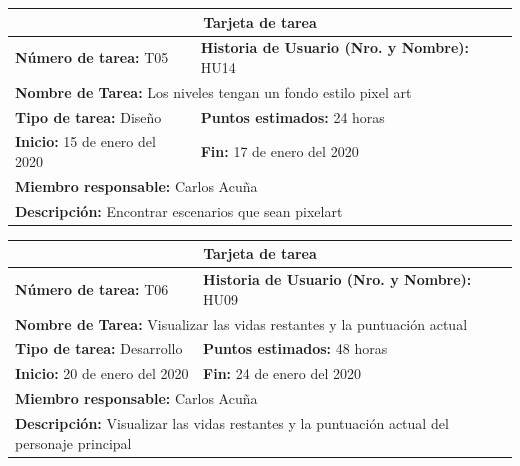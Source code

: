 \documentclass[a4paper, openright, 12pt]{report}
\begin{document}
\begin{longtable}{| p{6cm} | p{6cm} |}
\hline
\multicolumn{2}{|c|}{\textbf{Tarjeta de tarea}} \\
\hline
\textbf{Número de tarea:} T05 & \textbf{Historia de Usuario (Nro. y Nombre):} HU14\\
\hline
\multicolumn{2}{|p{12cm}|}{\textbf{Nombre de Tarea:} Los niveles tengan un fondo estilo pixel art} \\ \hline
\textbf{Tipo de tarea:} Diseño & \textbf{Puntos estimados:} 24 horas  \\ \hline
\textbf{Inicio:} 15 de enero del 2020 & \textbf{Fin:} 17 de enero del 2020 \\ \hline
\multicolumn{2}{|p{12cm}|}{\textbf{Miembro responsable:} Carlos Acuña} \\ \hline
\multicolumn{2}{|p{12cm}|}{\textbf{Descripción:} Encontrar escenarios que sean pixelart} \\ \hline
\end{longtable}

\begin{longtable}{| p{6cm} | p{6cm} |}
\hline
\multicolumn{2}{|c|}{\textbf{Tarjeta de tarea}} \\
\hline
\textbf{Número de tarea:} T06 & \textbf{Historia de Usuario (Nro. y Nombre):} HU09\\
\hline
\multicolumn{2}{|p{12cm}|}{\textbf{Nombre de Tarea:} Visualizar las vidas
restantes y la puntuación actual} \\ \hline
\textbf{Tipo de tarea:} Desarrollo & \textbf{Puntos estimados:} 48 horas  \\ \hline
\textbf{Inicio:} 20 de enero del 2020 & \textbf{Fin:} 24 de enero del 2020 \\ \hline
\multicolumn{2}{|p{12cm}|}{\textbf{Miembro responsable:} Carlos Acuña} \\ \hline
\multicolumn{2}{|p{12cm}|}{\textbf{Descripción:} Visualizar las vidas
restantes y la puntuación actual del personaje principal} \\ \hline
\end{longtable}
\end{document}
